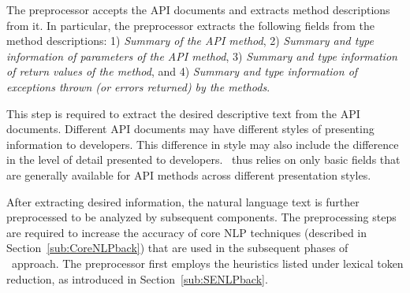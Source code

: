 The preprocessor accepts the API documents and extracts method descriptions from it.
In particular, the preprocessor extracts the following fields from the method descriptions: 
1) \textit{Summary of the API method},
2) \textit{Summary and type information of parameters of the API method}, 
3) \textit{Summary and type information of return values of the method}, and
4) \textit{Summary and type information of exceptions thrown (or errors returned) by the methods}.

This step is required to extract the desired descriptive text from the API documents.
Different API documents may have different styles of presenting information to developers.
This difference in style may also include the difference in the level of detail presented to developers.
\tool\ thus relies on only basic fields that are generally available for API methods across different presentation styles. 

After extracting desired information, the natural language text is further preprocessed to be analyzed by subsequent components.
The preprocessing steps are required to increase the accuracy of core NLP techniques (described in Section~\ref{sub:CoreNLPback}) that are used in the subsequent phases of \tool\ approach.
The preprocessor first employs the heuristics listed under lexical token reduction, as introduced in Section~\ref{sub:SENLPback}.

